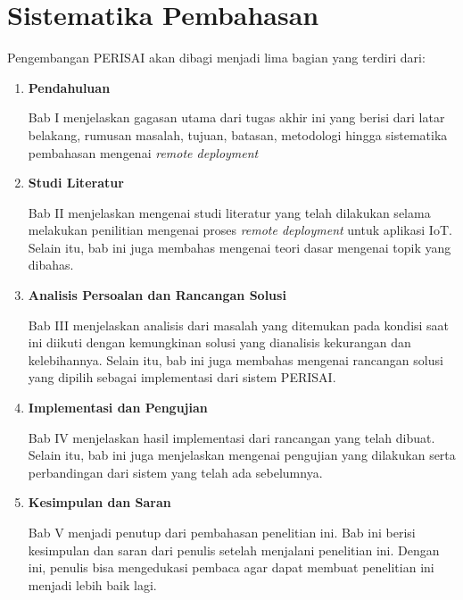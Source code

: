 \section{Sistematika Pembahasan}

Pengembangan PERISAI akan dibagi menjadi lima bagian yang terdiri dari:

\begin{enumerate}
  \item \textbf{Pendahuluan}

        Bab I menjelaskan gagasan utama dari tugas akhir ini yang berisi dari latar belakang, rumusan masalah, tujuan, batasan, metodologi hingga sistematika pembahasan mengenai \textit{remote deployment}

  \item \textbf{Studi Literatur}

        Bab II menjelaskan mengenai studi literatur yang telah dilakukan selama melakukan penilitian mengenai proses \textit{remote deployment} untuk aplikasi IoT. Selain itu, bab ini juga membahas mengenai teori dasar mengenai topik yang dibahas.

  \item \textbf{Analisis Persoalan dan Rancangan Solusi}

        Bab III menjelaskan analisis dari masalah yang ditemukan pada kondisi saat ini diikuti dengan kemungkinan solusi yang dianalisis kekurangan dan kelebihannya. Selain itu, bab ini juga membahas mengenai rancangan solusi yang dipilih sebagai implementasi dari sistem PERISAI.

  \item \textbf{Implementasi dan Pengujian}


        Bab IV menjelaskan hasil implementasi dari rancangan yang telah dibuat. Selain itu, bab ini juga menjelaskan mengenai pengujian yang dilakukan serta perbandingan dari sistem yang telah ada sebelumnya.

  \item \textbf{Kesimpulan dan Saran}


        Bab V menjadi penutup dari pembahasan penelitian ini. Bab ini berisi kesimpulan dan saran dari penulis setelah menjalani penelitian ini. Dengan ini, penulis bisa mengedukasi pembaca agar dapat membuat penelitian ini menjadi lebih baik lagi.

\end{enumerate}
